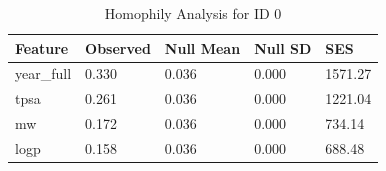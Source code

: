 \begin{table}
\caption{Homophily Analysis for ID 0}
\label{tab:homophily_id0}
\begin{tabular}{lllll}
\toprule
Feature & Observed & Null Mean & Null SD & SES \\
\midrule
year_full & 0.330 & 0.036 & 0.000 & 1571.27 \\
tpsa & 0.261 & 0.036 & 0.000 & 1221.04 \\
mw & 0.172 & 0.036 & 0.000 & 734.14 \\
logp & 0.158 & 0.036 & 0.000 & 688.48 \\
\bottomrule
\end{tabular}
\end{table}
